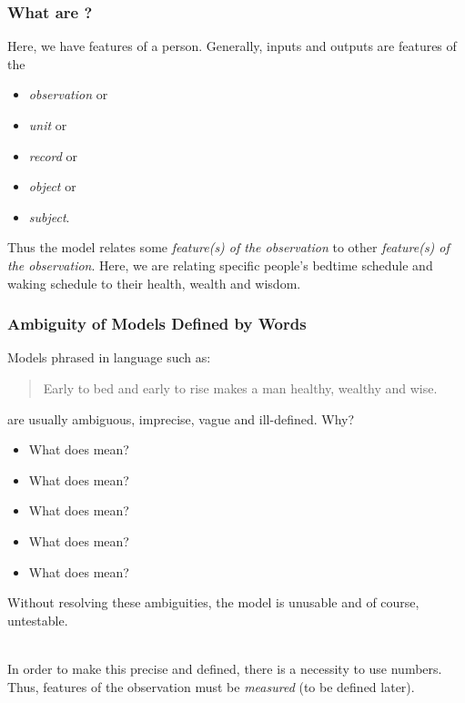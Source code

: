 \documentclass[handout]{beamer}
\begin{document}
\begin{frame}\frametitle{What are ?}

Here, we have features of a person. Generally, inputs and outputs are features of the 

\begin{itemize}
\item \textit{observation} or 
\item \textit{unit} or 
\item \textit{record} or 
\item \textit{object} or 
\item \textit{subject}.
\end{itemize} 


Thus the model relates some \textit{feature(s) of the observation} to other \textit{feature(s) of the observation}. Here, we are relating specific people's bedtime schedule and waking schedule to their health, wealth and wisdom.
\end{frame}






\begin{frame}\frametitle{Ambiguity of Models Defined by Words}

\small
Models phrased in language such as:

\begin{quotation}
Early to bed and early to rise makes a man healthy, wealthy and wise.
\end{quotation}

are usually ambiguous, imprecise, vague and ill-defined. Why? \pause 

\begin{itemize}
\item What does  mean? 
\item What does  mean? 
\item What does  mean? 
\item What does  mean? 
\item What does  mean?
\end{itemize}

Without resolving these ambiguities, \pause the model is unusable and of course, untestable. \\~\\ \pause
\vspace{-0.3cm}

In order to make this precise and defined, there is a necessity to use numbers. \pause Thus, features of the observation must be \textit{measured} (to be defined later). \pause 
	
\end{frame}
\end{document}
